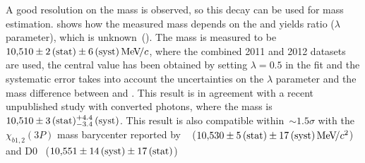 A good resolution on the \chiboneThreeP mass is observed, so this decay can be
used for \chiboneThreeP mass estimation.  shows how the
measured \chiboneThreeP mass depends on the \chiboneThreeP and \chibtwoThreeP
yields ratio ($\lambda$ parameter), which is unknown~().
The \chiboneThreeP mass is measured to be $10{,}510 \pm
2\mathrm{\,(stat)} \pm 6\mathrm{\,(syst)} {\mathrm{\,Me\kern -0.1em V\!/}c}$, where the combined 2011 and 2012 datasets are used, 
the central value has been obtained by setting $\lambda = 0.5$ in the fit and the 
systematic error takes into account the uncertainties on  
the $\lambda$ parameter and the mass difference between \chiboneThreeP and \chibtwoThreeP. 
This result is in agreement with a recent unpublished
\lhcb study with converted photons, where the \chiboneThreeP mass is
$10{,}510 \pm 3\mathrm{\,(stat)}{}^{+4.4}_{-3.4}\mathrm{\,(syst)}$. This result is also compatible within~$\sim{}1.5\sigma$ with 
the $\chi_{b1,2}(3P)$ mass barycenter reported by \atlas~\cite{Aad:2011ih} ($10{,}530 \pm 5\mathrm{\,(stat)}
\pm 17\mathrm{\,(syst)} {\mathrm{\,Me\kern -0.1em V\!/}c^2}$) and D0~\cite{Abazov:2012gh}  ($10{,}551 \pm 14\mathrm{\,(syst)} \pm 17\mathrm{\,(stat)}$)



% 



